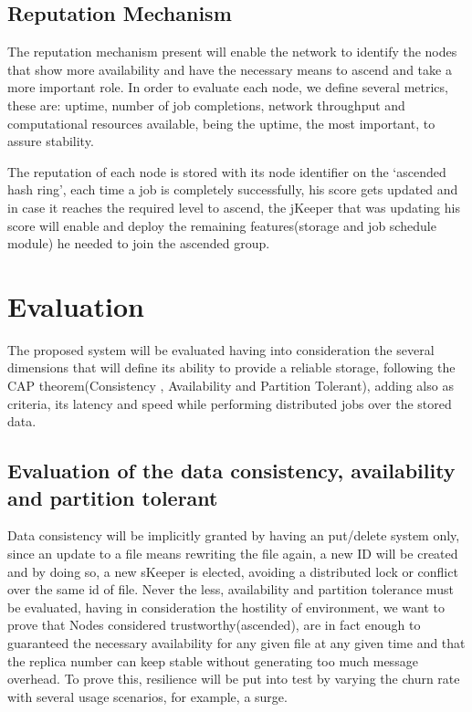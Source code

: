 \documentclass{./llncs2e/llncs}
\begin{document}
\subsection{Reputation Mechanism}

The reputation mechanism present will enable the network to identify the nodes that show more availability and have the necessary means to ascend and take a more important role. In order to evaluate each node, we define several metrics, these are: uptime, number of job completions, network throughput and  computational resources available, being the uptime, the most important, to assure stability.

The reputation of each node is stored with its node identifier on the `ascended hash ring', each time a job is completely successfully, his score gets updated and in case it reaches the required level to ascend, the jKeeper that was updating his score will enable and deploy the remaining features(storage and job schedule module) he needed to join the ascended group. 



% 
% 

\section{Evaluation}

The proposed system will be evaluated having into consideration the several dimensions that will define its ability to provide a reliable storage, following the CAP theorem(Consistency , Availability and Partition Tolerant), adding also as criteria, its latency and speed while performing distributed jobs over the stored data.

\subsection{Evaluation of the data consistency, availability and partition tolerant}

Data consistency will be implicitly granted by having an put/delete system only, since an update to a file means rewriting the file again, a new ID will be created and by doing so, a new sKeeper is elected, avoiding a distributed lock or conflict over the same id of file. Never the less, availability and partition tolerance must be evaluated, having in consideration the hostility of environment, we want to prove that Nodes considered trustworthy(ascended), are in fact enough to guaranteed the necessary availability for any given file at any given time and that the replica number can keep stable without generating too much message overhead. To prove this, resilience will be put into test by varying the churn rate with several usage scenarios, for example, a surge.
\end{document}
